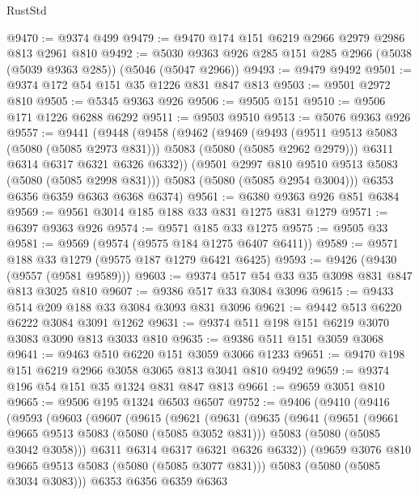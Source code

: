 \begin{lexlean}{RustStd}
\begin{coremodule}
{\begin{coremodule}
{{{{{@9470 := @9374 @499
@9479 := @9470 @174 @151 @6219 @2966 @2979 @2986 @813 @2961 @810
@9492 := @5030 @9363 @926 @285 @151 @285 @2966 (@5038 (@5039 @9363 @285)) (@5046 (@5047 @2966))
@9493 := @9479 @9492
@9501 := @9374 @172 @54 @151 @35 @1226 @831 @847 @813
@9503 := @9501 @2972 @810
@9505 := @5345 @9363 @926
@9506 := @9505 @151
@9510 := @9506 @171 @1226 @6288 @6292
@9511 := @9503 @9510
@9513 := @5076 @9363 @926
@9557 := @9441
    (@9448
      (@9458
        (@9462
          (@9469
            (@9493 (@9511 @9513 @5083 (@5080 (@5085 @2973 @831))) @5083 (@5080 (@5085 @2962 @2979)))
            @6311
            @6314
            @6317
            @6321
            @6326
            @6332))
        (@9501 @2997 @810 @9510 @9513 @5083 (@5080 (@5085 @2998 @831)))
        @5083
        (@5080 (@5085 @2954 @3004)))
      @6353
      @6356
      @6359
      @6363
      @6368
      @6374)
@9561 := @6380 @9363 @926 @851 @6384
@9569 := @9561 @3014 @185 @188 @33 @831 @1275 @831 @1279
@9571 := @6397 @9363 @926
@9574 := @9571 @185 @33 @1275
@9575 := @9505 @33
@9581 := @9569 (@9574 (@9575 @184 @1275 @6407 @6411))
@9589 := @9571 @188 @33 @1279 (@9575 @187 @1279 @6421 @6425)
@9593 := @9426 (@9430 (@9557 (@9581 @9589)))
@9603 := @9374 @517 @54 @33 @35 @3098 @831 @847 @813 @3025 @810
@9607 := @9386 @517 @33 @3084 @3096
@9615 := @9433 @514 @209 @188 @33 @3084 @3093 @831 @3096
@9621 := @9442 @513 @6220 @6222 @3084 @3091 @1262
@9631 := @9374 @511 @198 @151 @6219 @3070 @3083 @3090 @813 @3033 @810
@9635 := @9386 @511 @151 @3059 @3068
@9641 := @9463 @510 @6220 @151 @3059 @3066 @1233
@9651 := @9470 @198 @151 @6219 @2966 @3058 @3065 @813 @3041 @810 @9492
@9659 := @9374 @196 @54 @151 @35 @1324 @831 @847 @813
@9661 := @9659 @3051 @810
@9665 := @9506 @195 @1324 @6503 @6507
@9752 := @9406
    (@9410
      (@9416
        (@9593
          (@9603
            (@9607
              (@9615
                (@9621
                  (@9631
                    (@9635
                      (@9641
                        (@9651
                          (@9661 @9665 @9513 @5083 (@5080 (@5085 @3052 @831)))
                          @5083
                          (@5080 (@5085 @3042 @3058)))
                        @6311
                        @6314
                        @6317
                        @6321
                        @6326
                        @6332))
                    (@9659 @3076 @810 @9665 @9513 @5083 (@5080 (@5085 @3077 @831)))
                    @5083
                    (@5080 (@5085 @3034 @3083)))
                  @6353
                  @6356
                  @6359
                  @6363
}}}}}
\end{coremodule}}
\end{coremodule}
\end{lexlean}
